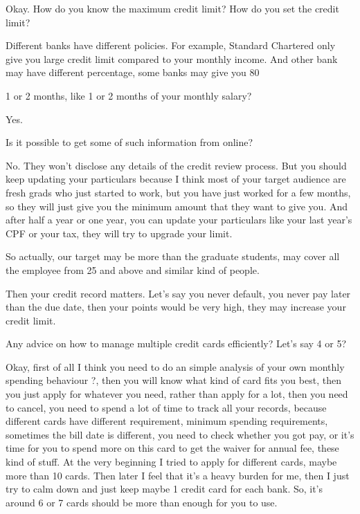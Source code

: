\begin{description}[leftmargin=4em,style=nextline]
	\item[JH:] Okay. How do you know the maximum credit limit? How do you set the credit limit?

	\item[HJ:] Different banks have different policies. For example, Standard Chartered only give you large credit limit compared to your monthly income. And other bank may have different percentage, some banks may give you 80%

	\item[JH:] 1 or 2 months, like 1 or 2 months of your monthly salary?

	\item[HJ:] Yes.

	\item[JH:] Is it possible to get some of such information from online?

	\item[HJ:] No. They won't disclose any details of the credit review process. But you should keep updating your particulars because I think most of your target audience are fresh grads who just started to work, but you have just worked for a few months, so they will just give you the minimum amount that they want to give you. And after half a year or one year, you can update your particulars like your last year's CPF or your tax, they will try to upgrade your limit.

	\item[JH:] So actually, our target may be more than the graduate students, may cover all the employee from 25 and above and similar kind of people.

	\item[HJ:] Then your credit record matters. Let's say you never default, you never pay later than the due date, then your points would be very high, they may increase your credit limit.

	\item[LD:] Any advice on how to manage multiple credit cards efficiently? Let's say 4 or 5?

	Okay, first of all I think you need to do an simple analysis of your own monthly spending behaviour ?, then you will know what kind of card fits you best, then you just apply for whatever you need, rather than apply for a lot, then you need to cancel, you need to spend a lot of time to track all your records, because different cards have different requirement, minimum spending requirements, sometimes the bill date is different, you need to check whether you got pay, or it's time for you to spend more on this card to get the waiver for annual fee, these kind of stuff. At the very beginning I tried to apply for different cards, maybe more than 10 cards. Then later I feel that it's a heavy burden for me, then I just try to calm down and just keep maybe 1 credit card for each bank. So, it's around 6 or 7 cards should be more than enough for you to use.


\end{description}
